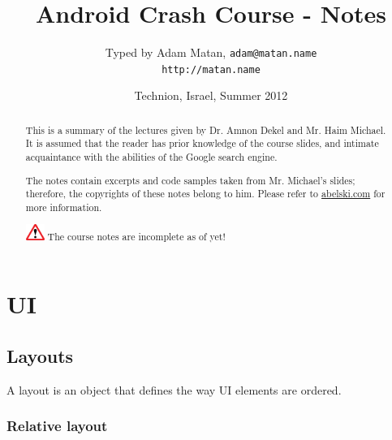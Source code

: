 \documentclass{article}
\begin{document}
\def\codefont{
\fontspec{Courier New}
  \fontsize{9pt}{11pt}\selectfont}
\newenvironment{code}
{\begin{center}
    \begin{tikzpicture}
      \node [fill=codebgcolor,rounded corners=5pt]
      \bgroup
      \bgroup\codefont
      \begin{tabular}{l}}
      {\end{tabular}
      \egroup
      \egroup;
    \end{tikzpicture}
  \end{center}}


\title{Android Crash Course - Notes}
\author{Typed by Adam Matan, \texttt{adam@matan.name} \\
\texttt{http://matan.name}}
\date{Technion, Israel, Summer 2012}

\maketitle

\begin{abstract}
This is a summary of the lectures given by Dr. Amnon Dekel and Mr. Haim Michael. It is assumed that the reader has prior knowledge of the course slides, and intimate acquaintance with the abilities of the Google search engine.

The notes contain excerpts and code samples taken from Mr. Michael's slides; therefore, the copyrights of these notes belong to him. Please refer to \href{http://www.abelski.com/moodle/}{abelski.com} for more information.

\includegraphics[width=0.05\textwidth]{img/warning_sign.eps} The course notes are incomplete as of yet!
\end{abstract}

\tableofcontents

\section{UI}
\subsection{Layouts}
A layout is an object that defines the way UI elements are ordered.

\subsubsection{Relative layout}
\end{document}
